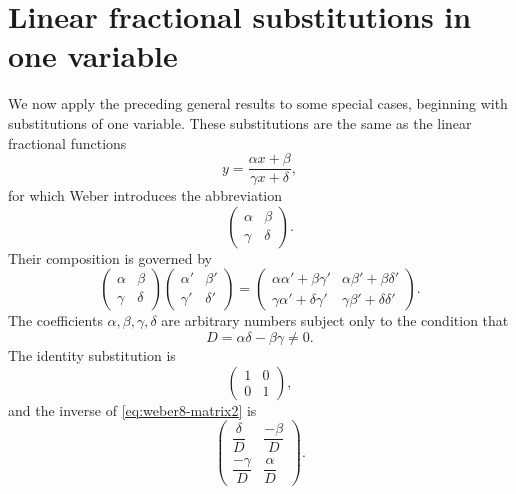 \documentclass[11pt]{article}
\begin{document}
\section*{Linear fractional substitutions in one variable}
We now apply the preceding general results to some special cases, beginning with substitutions of one variable.  These substitutions are the same as the linear fractional functions
\begin{equation}\label{eq:weber8-mobius}
y=\frac{\alpha x+\beta}{\gamma x+\delta},
\end{equation}
for which Weber introduces the abbreviation
\begin{equation}\label{eq:weber8-matrix2}
\begin{pmatrix}\alpha&\beta\\ \gamma&\delta\end{pmatrix}.
\end{equation}
Their composition is governed by
\begin{equation}\label{eq:weber8-mobius-product}
\begin{pmatrix}\alpha&\beta\\ \gamma&\delta\end{pmatrix}
\begin{pmatrix}\alpha'&\beta'\\ \gamma'&\delta'\end{pmatrix}
=
\begin{pmatrix}
\alpha\alpha'+\beta\gamma'&\alpha\beta'+\beta\delta'\\
\gamma\alpha'+\delta\gamma'&\gamma\beta'+\delta\delta'
\end{pmatrix}.
\end{equation}
The coefficients $\alpha,\beta,\gamma,\delta$ are arbitrary numbers subject only to the condition that
\[
D=\alpha\delta-\beta\gamma\ne0.
\]
The identity substitution is
\begin{equation}\label{eq:weber8-mobius-id}
\begin{pmatrix}1&0\\0&1\end{pmatrix},
\end{equation}
and the inverse of \eqref{eq:weber8-matrix2} is
\begin{equation}\label{eq:weber8-mobius-inverse}
\begin{pmatrix}
\dfrac{\delta}{D}&\dfrac{-\beta}{D}\\[6pt]
\dfrac{-\gamma}{D}&\dfrac{\alpha}{D}
\end{pmatrix}.
\end{equation}
\end{document}
